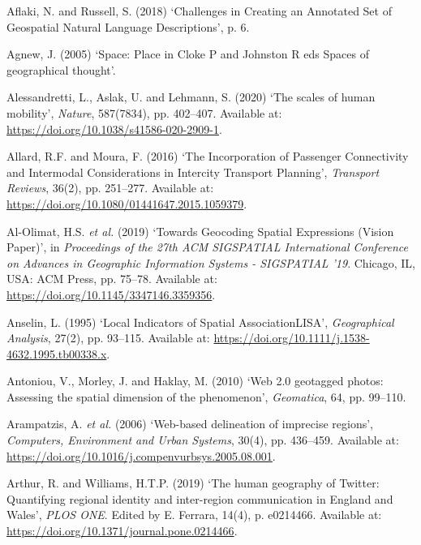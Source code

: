 \documentclass[
  letterpaper,
  11pt,
  english,
  onehalfspacing,
  headsepline]{MastersDoctoralThesis}
\newlength{\cslhangindent}
\newlength{\cslentryspacingunit} %
\newenvironment{CSLReferences}[2] %
 {%
  \setlength{\parindent}{0pt}
  \ifodd #1
  \let\oldpar\par
  \def\par{\hangindent=\cslhangindent\oldpar}
  \fi
  \setlength{\parskip}{#2\cslentryspacingunit}
 }%
 {}
\begin{document}
\hypertarget{refs}{}
\begin{CSLReferences}{0}{0}
\leavevmode{}%
Aflaki, N. and Russell, S. (2018) {`Challenges in {Creating} an
{Annotated Set} of {Geospatial Natural Language Descriptions}'}, p. 6.

\leavevmode{}%
Agnew, J. (2005) {`Space: Place in {Cloke P} and {Johnston R} eds
{Spaces} of geographical thought'}.

\leavevmode{}%
Alessandretti, L., Aslak, U. and Lehmann, S. (2020) {`The scales of
human mobility'}, \emph{Nature}, 587(7834), pp. 402--407. Available at:
\url{https://doi.org/10.1038/s41586-020-2909-1}.

\leavevmode{}%
Allard, R.F. and Moura, F. (2016) {`The {Incorporation} of {Passenger
Connectivity} and {Intermodal Considerations} in {Intercity Transport
Planning}'}, \emph{Transport Reviews}, 36(2), pp. 251--277. Available
at: \url{https://doi.org/10.1080/01441647.2015.1059379}.

\leavevmode{}%
Al-Olimat, H.S. \emph{et al.} (2019) {`Towards {Geocoding Spatial
Expressions} ({Vision Paper})'}, in \emph{Proceedings of the 27th {ACM
SIGSPATIAL International Conference} on {Advances} in {Geographic
Information Systems} - {SIGSPATIAL} '19}. {Chicago, IL, USA}: {ACM
Press}, pp. 75--78. Available at:
\url{https://doi.org/10.1145/3347146.3359356}.

\leavevmode{}%
Anselin, L. (1995) {`Local {Indicators} of {Spatial
Association}{\textemdash}{LISA}'}, \emph{Geographical Analysis}, 27(2),
pp. 93--115. Available at:
\url{https://doi.org/10.1111/j.1538-4632.1995.tb00338.x}.

\leavevmode{}%
Antoniou, V., Morley, J. and Haklay, M. (2010) {`Web 2.0 geotagged
photos: {Assessing} the spatial dimension of the phenomenon'},
\emph{Geomatica}, 64, pp. 99--110.

\leavevmode{}%
Arampatzis, A. \emph{et al.} (2006) {`Web-based delineation of imprecise
regions'}, \emph{Computers, Environment and Urban Systems}, 30(4), pp.
436--459. Available at:
\url{https://doi.org/10.1016/j.compenvurbsys.2005.08.001}.

\leavevmode{}%
Arthur, R. and Williams, H.T.P. (2019) {`The human geography of
{Twitter}: {Quantifying} regional identity and inter-region
communication in {England} and {Wales}'}, \emph{PLOS ONE}. Edited by E.
Ferrara, 14(4), p. e0214466. Available at:
\url{https://doi.org/10.1371/journal.pone.0214466}.


\end{CSLReferences}
\end{document}
